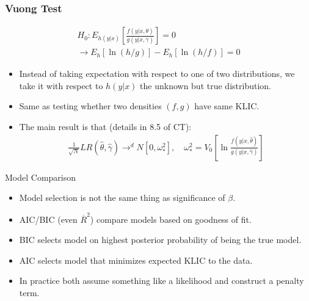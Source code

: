 \documentclass[xcolor=pdftex,dvipsnames,table,mathserif,aspectratio=169]{beamer}
\begin{document}
\begin{frame}
\frametitle{Vuong Test}
\small
\begin{eqnarray*}
H_0: E_{h(y|x)} \left[ \frac{ f(y | x,\theta) }{g(y | x, \gamma)} \right] = 0  \\
\rightarrow E_h[\ln(h/g)] - E_h[\ln (h/f)] = 0
\end{eqnarray*}
\begin{itemize}
\item Instead of taking expectation with respect to one of two distributions, we take it with respect to $h(y |x)$ the unknown but \alert{true distribution}.
\item Same as testing whether two densities $(f,g)$ have same KLIC.
\item The main result is that (details in 8.5 of CT):
\begin{eqnarray*}
\frac{1}{\sqrt{N}} LR(\hat{\theta},\hat{\gamma}) \rightarrow^d N [0,\omega_{*}^2],\quad \omega_{*}^2 =  V_0 \left[ \ln \frac{f(y| x, \hat{\theta})}{g(y| x, \hat{\gamma})}  \right]
\end{eqnarray*}
\end{itemize}
\end{frame}

\begin{frame}{Model Comparison}
\begin{itemize}
\item Model selection is not the same thing as significance of $\beta$.
\item AIC/BIC (even $\overline{R}^2$) compare models based on goodness of fit.
\item BIC selects model on highest posterior probability of being the true model.
\item AIC selects model that minimizes expected KLIC to the data. 
\item In practice both assume something like a likelihood and construct a penalty term.
\end{itemize}

\end{frame}
\end{document}
